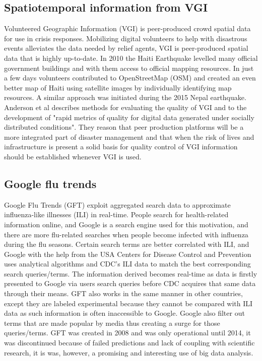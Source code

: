 \subsection{Spatiotemporal information from VGI}
Volunteered Geographic Information (VGI) is peer-produced crowd spatial data for use in crisis responses. Mobilizing digital volunteers to help with disastrous events alleviates the data needed by relief agents, VGI is peer-produced spatial data that is highly up-to-date. In 2010 the Haiti Earthquake levelled many official government buildings and with them access to official mapping resources\cite{palen2015success}. In just a few days volunteers contributed to OpenStreetMap\cite{OpenStreetMap} (OSM) and created an even better map of Haiti using satellite images by individually identifying map resources. A similar approach was initiated during the 2015 Nepal earthquake\cite{hu2016task}. Anderson et al\cite{anderson2018crowd} describes methods for evaluating the quality of VGI and to the development of "rapid metrics of quality for digital data generated under socially distributed conditions". They reason that peer production platforms will be a more integrated part of disaster management and that when the risk of lives and infrastructure is present a solid basis for quality control of VGI information should be established whenever VGI is used.





\subsection{Google flu trends}
Google Flu Trends (GFT) exploit aggregated search data to approximate influenza-like illnesses (ILI) in real-time. People search for health-related information online, and Google is a search engine used for this motivation, and there are more flu-related searches when people become infected with influenza during the flu seasons. Certain search terms are better correlated with ILI, and Google with the help from the USA Centers for Disease Control and Prevention\cite{CDC} uses analytical algorithms and CDC's ILI data to match the best corresponding search queries/terms. The information derived becomes real-time as data is firstly presented to Google via users search queries before CDC acquires that same data through their means. GFT also works in the same manner in other countries, except they are labeled experimental because they cannot be compared with ILI data as such information is often inaccessible to Google. Google also filter out terms that are made popular by media thus creating a surge for those queries/terms. GFT was created in 2008 and was only operational until 2014, it was discontinued because of failed predictions and lack of coupling with scientific research, it is was, however, a promising and interesting use of big data analysis.


